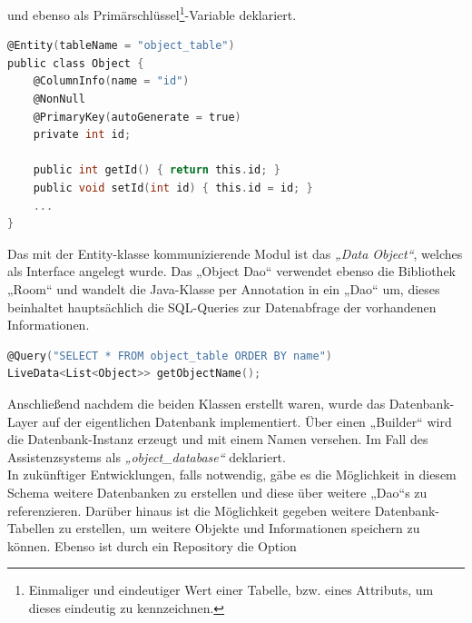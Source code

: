 und ebenso als Primärschlüssel\footnote{Einmaliger und eindeutiger Wert einer Tabelle, bzw. eines Attributs, um dieses eindeutig zu kennzeichnen.}-Variable 
deklariert.
\\ 
\linebreak
\begin{lstlisting}[language=C,
    frame=lines,           % Ein Rahmen um den Code (single for box, lines for top and bottom)
    xleftmargin=\parindent,  % Rahmen link von den Zahlen
    style=algoBericht,
    label={code:entity},
    captionpos=b,           % Caption unter den Code setzen
caption={Entity Code zur Initialisierung der Objekte}]
@Entity(tableName = "object_table")
public class Object {
    @ColumnInfo(name = "id")
    @NonNull
    @PrimaryKey(autoGenerate = true)
    private int id;

    public int getId() { return this.id; }
    public void setId(int id) { this.id = id; }
    ... 
}
\end{lstlisting}
\pagebreak
Das mit der Entity-klasse kommunizierende Modul ist das \textit{„Data Object“}, welches als Interface angelegt wurde. Das „Object Dao“ verwendet ebenso die Bibliothek 
„Room“ und wandelt die Java-Klasse per Annotation in ein „Dao“ um, dieses beinhaltet hauptsächlich die SQL-Queries zur Datenabfrage der vorhandenen Informationen. 
\\
\linebreak
\begin{lstlisting}[language=C,
    frame=lines,           % Ein Rahmen um den Code (single for box, lines for top and bottom)
    xleftmargin=\parindent,  % Rahmen link von den Zahlen
    style=algoBericht,
    label={code:query},
    captionpos=b,           % Caption unter den Code setzen
caption={SQL-Query zur Abfrage der Objekt-Namen}]
@Query("SELECT * FROM object_table ORDER BY name")
LiveData<List<Object>> getObjectName();
\end{lstlisting}
Anschließend nachdem die beiden Klassen erstellt waren, wurde das Datenbank-Layer auf der eigentlichen Datenbank implementiert. Über einen „Builder“ wird die 
Datenbank-Instanz erzeugt und mit einem Namen versehen. Im Fall des Assistenzsystems als \textit{„object\_database“} deklariert. 
\\ 
In zukünftiger Entwicklungen, 
falls notwendig, gäbe es die Möglichkeit in diesem Schema weitere Datenbanken zu erstellen und diese über weitere „Dao“s zu referenzieren. Darüber hinaus ist die 
Möglichkeit gegeben weitere Datenbank-Tabellen zu erstellen, um weitere Objekte und Informationen speichern zu können. Ebenso ist durch ein Repository die Option 
